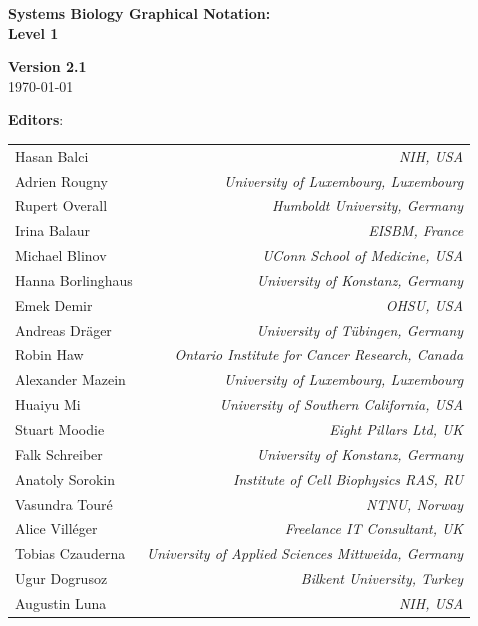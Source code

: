 \begin{titlepage}

\vspace*{0.75in}

\begin{center}

\textbf{\sffamily\bfseries\huge
Systems Biology Graphical Notation:\\[0.3em]
\PDl Level 1}

\vspace*{0.5in}

\Large
\textbf{Version 2.1}\\[0.1in]

\large
\today\\[0.25in]

\vspace{0.5in}

\textbf{\sffamily Editors}:\\[7pt]

\begin{tabular}{l>{\hspace*{15pt}}r}
Hasan Balci   & \emph{NIH, USA}\\
Adrien Rougny   & \emph{University of Luxembourg, Luxembourg}\\
Rupert Overall   & \emph{Humboldt University, Germany}\\
Irina Balaur & \emph{EISBM, France}\\
Michael Blinov & \emph{UConn School of Medicine, USA}\\
Hanna Borlinghaus & \emph{University of Konstanz, Germany}\\
Emek Demir    & \emph{OHSU, USA}\\
Andreas Dräger   & \emph{University of Tübingen, Germany}\\
Robin Haw   & \emph{Ontario Institute for Cancer Research, Canada}\\
Alexander Mazein   & \emph{University of Luxembourg, Luxembourg}\\
Huaiyu Mi	& \emph{University of Southern California, USA}\\
Stuart Moodie   & \emph{Eight Pillars Ltd, UK}\\
Falk Schreiber	 & \emph{University of Konstanz, Germany}\\
Anatoly Sorokin   & \emph{Institute of Cell Biophysics RAS, RU}\\ 
Vasundra Touré   & \emph{NTNU, Norway}\\
Alice Vill\'{e}ger   & \emph{Freelance IT Consultant, UK}\\
Tobias Czauderna   & \emph{University of Applied Sciences Mittweida, Germany}\\
Ugur Dogrusoz   & \emph{Bilkent University, Turkey}\\
Augustin Luna   & \emph{NIH, USA}\\
\end{tabular}


\end{center}
\end{titlepage}
